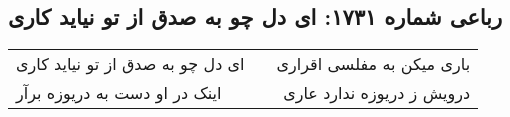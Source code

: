 \begin{center}
\section*{رباعی شماره ۱۷۳۱: ای دل چو به صدق از تو نیاید کاری}
\label{sec:1731}
\begin{longtable}{l p{0.5cm} r}
ای دل چو به صدق از تو نیاید کاری
&&
باری میکن به مفلسی اقراری
\\
اینک در او دست به دریوزه برآر
&&
درویش ز دریوزه ندارد عاری
\\
\end{longtable}
\end{center}
